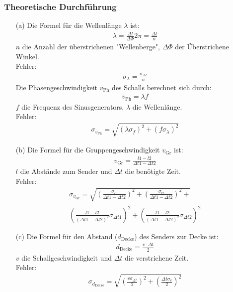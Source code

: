 \documentclass[12pt]{scrartcl}
\begin{document}
\subsubsection{Theoretische Durchführung}
\begin{enumerate}
\item[(a)]
Die Formel für die Wellenlänge $\lambda$ ist:
\begin{align}
\lambda = \frac{\Delta l}{\Delta \Phi} 2\pi
= \frac{\Delta l}{n}
\end{align}
$n$ die Anzahl der überstrichenen "Wellenberge", $\Delta \Phi$ der Überstrichene Winkel.\\
Fehler:
\begin{align}
\sigma_{\lambda} = \frac{\sigma_{\Delta l}}{n}
\end{align}
Die Phasengeschwindigkeit $v_{\text{Ph}}$ des Schalls berechnet sich durch:
\begin{align}
v_{\text{Ph}} = \lambda f
\end{align}
$f$ die Frequenz des Sinusgenerators, $\lambda$ die Wellenlänge.\\
Fehler:
\begin{align}
\sigma_{v_{\text{Ph}}} = \sqrt{
\left(\lambda \sigma_f\right)^2+
\left(f \sigma_{\lambda}\right)^2}
\end{align}
\item[(b)]
Die Formel für die Gruppengeschwindigkeit $v_{\text{Gr}}$ ist:
\begin{align}
v_{\text{Gr}} = \frac{l1-l2}{\Delta t1 - \Delta t2}
\end{align}
$l$ die Abstände zum Sender und $\Delta t$ die benötigte Zeit.\\
Fehler:
\begin{equation}
\begin{split}
\sigma_{v_{\text{Gr}}} = \sqrt{
\left(\frac{\sigma_{l1}}{\Delta t1 - \Delta t2}\right)^2+
\left(\frac{\sigma_{l2}}{\Delta t1 - \Delta t2}\right)^2+}\\
\overline{\left(\frac{l1-l2}{(\Delta t1 - \Delta t2)^2}\sigma_{\Delta t1}
\right)^2+
\left(\frac{l1-l2}{(\Delta t1 - \Delta t2)^2}\sigma_{\Delta t2}\right)^2}
\end{split}
\end{equation}
\item[(c)]
Die Formel für den Abstand ($d_{\text{Decke}}$) des Senders zur Decke ist:
\begin{align}
d_{\text{Decke}} = \frac{v \cdot \Delta t}{2}
\end{align}
$v$ die Schallgeschwindigkeit und $\Delta t$ die verstrichene Zeit.\\
Fehler:
\begin{align}
\sigma_{d_{\text{Decke}}} = \sqrt{
\left(\frac{v \sigma_{\Delta t}}{2}\right)^2+
\left(\frac{\Delta t \sigma_v}{2}\right)^2}
\end{align}
\end{enumerate}
\end{document}

